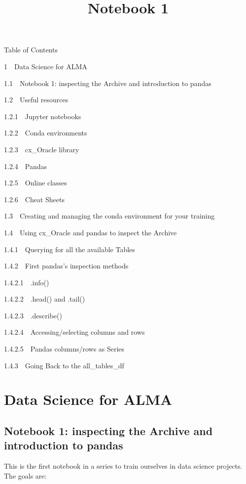 \documentclass[11pt]{article}
\title{Notebook 1}
\begin{document}
    
    
    \maketitle
    
    

    
    Table of Contents{}

{{1~~}Data Science for ALMA}

{{1.1~~}Notebook 1: inspecting the Archive and introduction to pandas}

{{1.2~~}Useful resources}

{{1.2.1~~}Jupyter notebooks}

{{1.2.2~~}Conda environments}

{{1.2.3~~}cx\_Oracle library}

{{1.2.4~~}Pandas}

{{1.2.5~~}Online classes}

{{1.2.6~~}Cheat Sheets}

{{1.3~~}Creating and managing the conda environment for your training}

{{1.4~~}Using cx\_Oracle and pandas to inspect the Archive}

{{1.4.1~~}Querying for all the available Tables}

{{1.4.2~~}First pandas's inspection methods}

{{1.4.2.1~~}.info()}

{{1.4.2.2~~}.head() and .tail()}

{{1.4.2.3~~}.describe()}

{{1.4.2.4~~}Accessing/selecting columns and rows}

{{1.4.2.5~~}Pandas columns/rows as Series}

{{1.4.3~~}Going Back to the all\_tables\_df}

    \section{Data Science for ALMA}\label{data-science-for-alma}

\subsection{Notebook 1: inspecting the Archive and introduction to
pandas}\label{notebook-1-inspecting-the-archive-and-introduction-to-pandas}

This is the first notebook in a series to train ourselves in data
science projects. The goals are:
\end{document}
